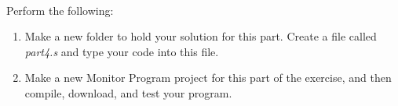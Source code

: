 \documentclass[epsfig,10pt,fullpage]{article}
\newcommand{\CommonDocsPath}{../../../../common/docs}
\begin{document}
~\\
\noindent
Perform the following:

\begin{enumerate}
\item Make a new folder to hold your solution for this part. Create a
file called {\it part4.s} and type your code into this file.  
\item Make a new Monitor Program 
project for this part of the exercise, and then compile, download, and test your program. 
\end{enumerate}



\end{document}
